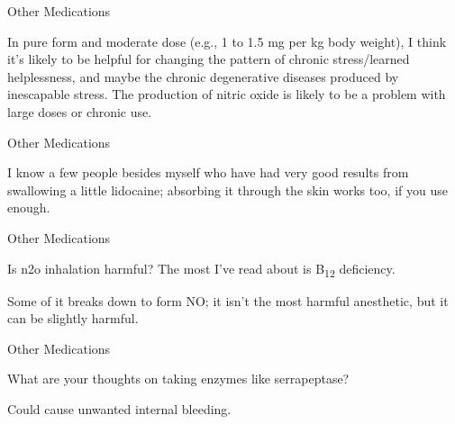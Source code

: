 \documentclass[11pt,oneside,openany,extrafontsizes]{memoir}
\begin{document}
\begin{standalonequote}{Other Medications}

    \begin{answer}
      In pure form and moderate dose (e.g., 1 to 1.5 mg per kg body weight), I think it's likely to be helpful for changing the pattern of chronic stress/learned helplessness, and maybe the chronic degenerative diseases produced by inescapable stress. The production of nitric oxide is likely to be a problem with large doses or chronic use.
    \end{answer}
\end{standalonequote}

\begin{standalonequote}{Other Medications}

    \begin{answer}
       I know a few people besides myself who have had very good results from swallowing a little lidocaine; absorbing it through the skin works too, if you use enough. 
    \end{answer}
\end{standalonequote}

\begin{qaexchange}{Other Medications}

    \begin{question}
        Is n2o inhalation harmful? The most I've read about is B\textsubscript{12} deficiency.
    \end{question}

    \begin{answer}
      Some of it breaks down to form NO; it isn't the most harmful anesthetic, but it can be slightly harmful.
    \end{answer}
\end{qaexchange}

\begin{qaexchange}{Other Medications}

    \begin{question}
        What are your thoughts on taking enzymes like serrapeptase?
    \end{question}

    \begin{answer}
      Could cause unwanted internal bleeding.
    \end{answer}
\end{qaexchange}
\end{document}
